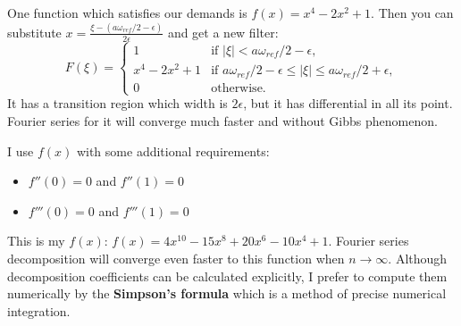 \documentclass[a4paper,11pt,fleqn]{article}
\begin{document}
One function which satisfies our demands is $f(x) = x^{4} - 2x^{2} + 1$. Then you can substitute $x = \frac{\xi - (a\omega_{ref}/2 - \epsilon)}{2 \epsilon}$ and get a new filter:
\begin{equation}
\label{notsoideal}
F(\xi) = \left\{
\begin{array}{rl}
1 & \text{if } \left|\xi\right| < a\omega_{ref}/2-\epsilon,\\
x^{4} - 2x^{2} + 1 & \text{if } a\omega_{ref}/2-\epsilon \leq \left|\xi\right| \leq a\omega_{ref}/2+\epsilon,\\
0 & \text{otherwise}.
\end{array} \right.
\end{equation}
It has a transition region which width is $2\epsilon$, but it has differential in all its point. Fourier series for it will converge much faster and without Gibbs phenomenon.

I use $f(x)$ with some additional requirements:
\begin{itemize}
\item $f''(0) = 0$ and $f''(1) = 0$
\item $f'''(0) = 0$ and $f'''(1) = 0$
\end{itemize}
This is my $f(x)$: $f(x) = 4x^{10}-15x^{8}+20x^{6}-10x^{4}+1$. Fourier series decomposition will converge even faster to this function when $n \to \infty$. Although decomposition coefficients can be calculated
explicitly, I prefer to compute them numerically by the \textbf{Simpson's formula} which is a method of precise numerical integration.
\end{document}
